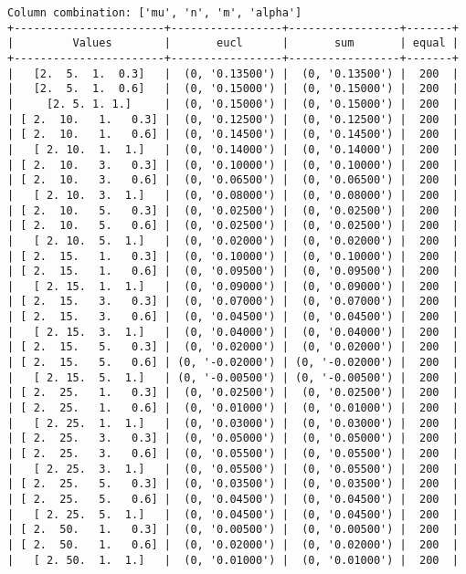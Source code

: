 \documentclass{article}
\begin{document}
\begin{verbatim}
Column combination: ['mu', 'n', 'm', 'alpha']
+-----------------------+-----------------+-----------------+-------+
|         Values        |       eucl      |       sum       | equal |
+-----------------------+-----------------+-----------------+-------+
|   [2.  5.  1.  0.3]   |  (0, '0.13500') |  (0, '0.13500') |  200  |
|   [2.  5.  1.  0.6]   |  (0, '0.15000') |  (0, '0.15000') |  200  |
|     [2. 5. 1. 1.]     |  (0, '0.15000') |  (0, '0.15000') |  200  |
| [ 2.  10.   1.   0.3] |  (0, '0.12500') |  (0, '0.12500') |  200  |
| [ 2.  10.   1.   0.6] |  (0, '0.14500') |  (0, '0.14500') |  200  |
|   [ 2. 10.  1.  1.]   |  (0, '0.14000') |  (0, '0.14000') |  200  |
| [ 2.  10.   3.   0.3] |  (0, '0.10000') |  (0, '0.10000') |  200  |
| [ 2.  10.   3.   0.6] |  (0, '0.06500') |  (0, '0.06500') |  200  |
|   [ 2. 10.  3.  1.]   |  (0, '0.08000') |  (0, '0.08000') |  200  |
| [ 2.  10.   5.   0.3] |  (0, '0.02500') |  (0, '0.02500') |  200  |
| [ 2.  10.   5.   0.6] |  (0, '0.02500') |  (0, '0.02500') |  200  |
|   [ 2. 10.  5.  1.]   |  (0, '0.02000') |  (0, '0.02000') |  200  |
| [ 2.  15.   1.   0.3] |  (0, '0.10000') |  (0, '0.10000') |  200  |
| [ 2.  15.   1.   0.6] |  (0, '0.09500') |  (0, '0.09500') |  200  |
|   [ 2. 15.  1.  1.]   |  (0, '0.09000') |  (0, '0.09000') |  200  |
| [ 2.  15.   3.   0.3] |  (0, '0.07000') |  (0, '0.07000') |  200  |
| [ 2.  15.   3.   0.6] |  (0, '0.04500') |  (0, '0.04500') |  200  |
|   [ 2. 15.  3.  1.]   |  (0, '0.04000') |  (0, '0.04000') |  200  |
| [ 2.  15.   5.   0.3] |  (0, '0.02000') |  (0, '0.02000') |  200  |
| [ 2.  15.   5.   0.6] | (0, '-0.02000') | (0, '-0.02000') |  200  |
|   [ 2. 15.  5.  1.]   | (0, '-0.00500') | (0, '-0.00500') |  200  |
| [ 2.  25.   1.   0.3] |  (0, '0.02500') |  (0, '0.02500') |  200  |
| [ 2.  25.   1.   0.6] |  (0, '0.01000') |  (0, '0.01000') |  200  |
|   [ 2. 25.  1.  1.]   |  (0, '0.03000') |  (0, '0.03000') |  200  |
| [ 2.  25.   3.   0.3] |  (0, '0.05000') |  (0, '0.05000') |  200  |
| [ 2.  25.   3.   0.6] |  (0, '0.05500') |  (0, '0.05500') |  200  |
|   [ 2. 25.  3.  1.]   |  (0, '0.05500') |  (0, '0.05500') |  200  |
| [ 2.  25.   5.   0.3] |  (0, '0.03500') |  (0, '0.03500') |  200  |
| [ 2.  25.   5.   0.6] |  (0, '0.04500') |  (0, '0.04500') |  200  |
|   [ 2. 25.  5.  1.]   |  (0, '0.04500') |  (0, '0.04500') |  200  |
| [ 2.  50.   1.   0.3] |  (0, '0.00500') |  (0, '0.00500') |  200  |
| [ 2.  50.   1.   0.6] |  (0, '0.02000') |  (0, '0.02000') |  200  |
|   [ 2. 50.  1.  1.]   |  (0, '0.01000') |  (0, '0.01000') |  200  |

\end{verbatim}
\end{document}
